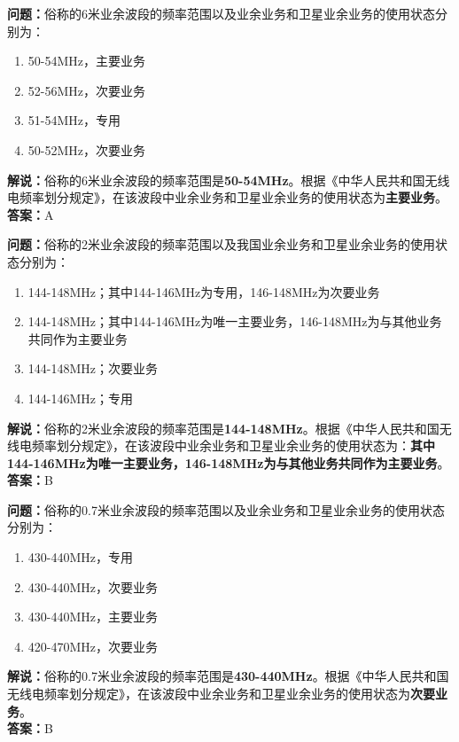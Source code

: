 \documentclass{ctexbook}
\begin{document}
\bigskip


\noindent\textbf{问题：}俗称的6米业余波段的频率范围以及业余业务和卫星业余业务的使用状态分别为：
\begin{enumerate}[label=\Alph*), leftmargin=3em]
	\item 50-54MHz，主要业务
	\item 52-56MHz，次要业务
	\item 51-54MHz，专用
	\item 50-52MHz，次要业务
\end{enumerate}
\noindent\textbf{解说：}俗称的6米业余波段的频率范围是\textbf{50-54MHz}。根据《中华人民共和国无线电频率划分规定》，在该波段中业余业务和卫星业余业务的使用状态为\textbf{主要业务}。\\\noindent\textbf{答案：}A


\bigskip


\noindent\textbf{问题：}俗称的2米业余波段的频率范围以及我国业余业务和卫星业余业务的使用状态分别为：
\begin{enumerate}[label=\Alph*), leftmargin=3em]
	\item 144-148MHz；其中144-146MHz为专用，146-148MHz为次要业务
	\item 144-148MHz；其中144-146MHz为唯一主要业务，146-148MHz为与其他业务共同作为主要业务
	\item 144-148MHz；次要业务
	\item 144-146MHz；专用
\end{enumerate}
\noindent\textbf{解说：}俗称的2米业余波段的频率范围是\textbf{144-148MHz}。根据《中华人民共和国无线电频率划分规定》，在该波段中业余业务和卫星业余业务的使用状态为：\textbf{其中144-146MHz为唯一主要业务，146-148MHz为与其他业务共同作为主要业务}。\\\noindent\textbf{答案：}B


\bigskip


\noindent\textbf{问题：}俗称的0.7米业余波段的频率范围以及业余业务和卫星业余业务的使用状态分别为：
\begin{enumerate}[label=\Alph*), leftmargin=3em]
	\item 430-440MHz，专用
	\item 430-440MHz，次要业务
	\item 430-440MHz，主要业务
	\item 420-470MHz，次要业务
\end{enumerate}
\noindent\textbf{解说：}俗称的0.7米业余波段的频率范围是\textbf{430-440MHz}。根据《中华人民共和国无线电频率划分规定》，在该波段中业余业务和卫星业余业务的使用状态为\textbf{次要业务}。\\\noindent\textbf{答案：}B
\end{document}
